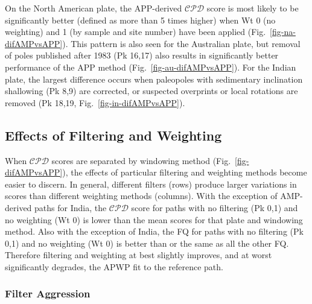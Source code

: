 On the North American plate, the APP-derived $\mathcal{CPD}$ score is most
likely to be significantly better (defined as more than 5 times higher) when
Wt 0 (no weighting) and 1 (by sample and site number) have been
applied (Fig.~\ref{fig-na-difAMPvsAPP}). This pattern is also seen for the
Australian plate, but removal of poles published after 1983 (Pk 16,17) also
results in significantly better performance of the APP method
(Fig.~\ref{fig-au-difAMPvsAPP}). For the Indian plate, the largest difference
occurs when paleopoles with sedimentary inclination shallowing (Pk 8,9) are
corrected, or suspected overprints or local rotations are removed (Pk
18,19, Fig.~\ref{fig-in-difAMPvsAPP}).

\subsection{Effects of Filtering and Weighting}

When $\mathcal{CPD}$ scores are separated by windowing method
(Fig.~\ref{fig-difAMPvsAPP}), the effects of particular filtering and weighting
methods become easier to discern. In general, different filters (rows) produce
larger variations in scores than different weighting methods (columns). With the
exception of AMP-derived paths for India, the $\mathcal{CPD}$ score for paths
with no filtering (Pk 0,1) and no weighting (Wt 0) is lower than the mean scores
for that plate and windowing method. Also with the exception of India, the FQ
for paths with no filtering (Pk 0,1) and no weighting (Wt 0) is better than or
the same as all the other FQ\@. Therefore filtering and weighting at best
slightly improves, and at worst significantly degrades, the APWP fit to the
reference path.

\subsubsection{Filter Aggression}

